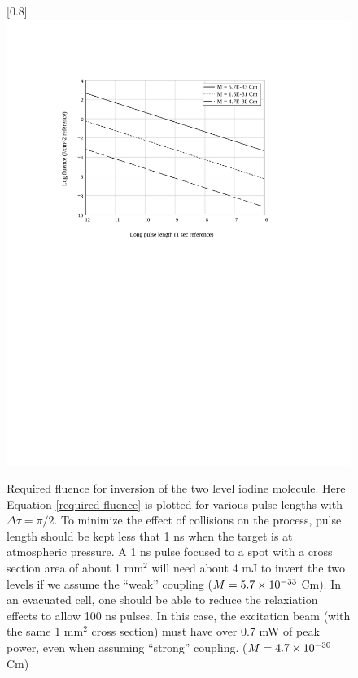 \begin{figure}
\scalebox{0.8}[0.8]{
\includegraphics[bb=30 405 489 670]
{fluence/fluence.pdf}
}
\caption[Required fluence for inversion of the two level iodine molecule]{Required fluence for inversion of the two level iodine molecule. Here Equation \ref{required fluence} is plotted for various pulse lengths with $\Delta \tau = \pi/2$. To minimize the effect of collisions on the process, pulse length should be kept less that 1 ns when the target is at atmospheric pressure. A 1 ns pulse focused to a spot with a cross section area of about 1 mm$^2$ will need about 4 mJ to invert the two levels if we assume the ``weak'' coupling ($M=5.7\times10^{-33}$ Cm). In an evacuated cell, one should be able to reduce the relaxiation effects to allow 100 ns pulses. In this case, the excitation beam (with the same 1 mm$^2$ cross section) must have over 0.7 mW of peak power, even when assuming ``strong'' coupling. ($M=4.7\times10^{-30}$ Cm)}
\label{fluence}
\end{figure}
